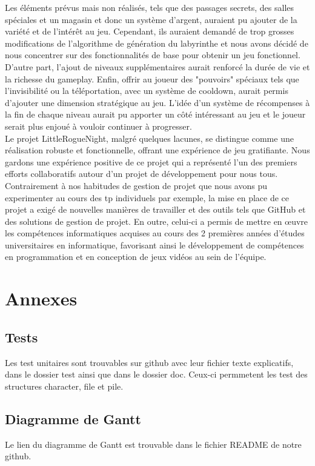 \documentclass[10pt]{article}
\begin{document}
Les éléments prévus mais non réalisés, tels que des passages secrets, des salles spéciales et un magasin et donc un système d'argent, auraient pu ajouter de la variété et de l'intérêt au jeu. Cependant, ils auraient demandé de trop grosses modifications de l'algorithme de génération du labyrinthe et nous avons décidé de nous concentrer sur des fonctionnalités de base pour obtenir un jeu fonctionnel. D'autre part, l'ajout de niveaux supplémentaires aurait renforcé la durée de vie et la richesse du \gls{gameplay}. Enfin, offrir au joueur des "pouvoirs" spéciaux tels que l'invisibilité ou la téléportation, avec un système de \gls{cooldown}, aurait permis d'ajouter une dimension stratégique au jeu. L'idée d'un système de récompenses à la fin de chaque niveau aurait pu apporter un côté intéressant au jeu et le joueur serait plus enjoué à vouloir continuer à progresser. \\

Le projet LittleRogueNight, malgré quelques lacunes, se distingue comme une réalisation robuste et fonctionnelle, offrant une expérience de jeu gratifiante. Nous gardons une expérience positive de ce projet qui a représenté l'un des premiers efforts collaboratifs autour d'un projet de développement pour nous tous. Contrairement à nos habitudes de gestion de projet que nous avons pu experimenter au cours des tp individuels par exemple, la mise en place de ce projet a exigé de nouvelles manières de travailler et des outils tels que GitHub et des solutions de gestion de projet. En outre, celui-ci a permis de mettre en œuvre les compétences informatiques acquises au cours des 2 premières années d'études universitaires en informatique, favorisant ainsi le développement de compétences en programmation et en conception de jeux vidéos au sein de l'équipe.

\clearpage
\printglossary
\section{Annexes}
\subsection{Tests}
Les test unitaires sont trouvables sur github avec leur fichier texte explicatifs, dans le dossier test ainsi que dans le dossier doc. Ceux-ci permmetent les test des structures character, file et pile.\\
\subsection{Diagramme de Gantt}
Le lien du diagramme de Gantt est trouvable dans le fichier README de notre github.\\
\end{document}
